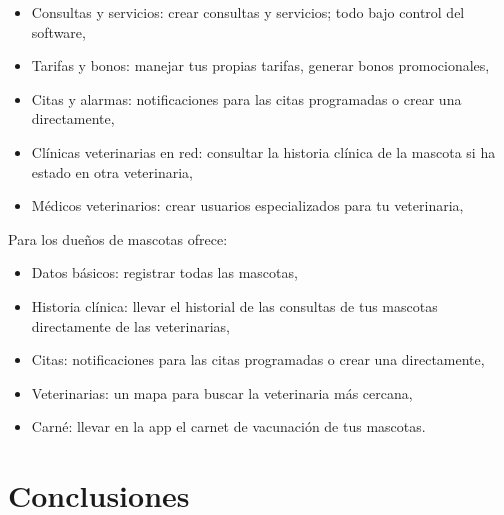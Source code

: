 %		

\begin{itemize}
	\item	Consultas y servicios: crear consultas y servicios; todo bajo control del software,
	\item	Tarifas y bonos: manejar tus propias tarifas, generar bonos promocionales,
	\item	Citas y alarmas: notificaciones para las citas programadas o crear una directamente,
	\item	Clínicas veterinarias en red: consultar la historia clínica de la mascota si ha estado en otra veterinaria,
	\item	Médicos veterinarios: crear usuarios especializados para tu veterinaria,
\end{itemize}
Para los dueños de mascotas ofrece:
\begin{itemize}
	\item	Datos básicos: registrar todas las mascotas,
	\item	Historia clínica: llevar el historial de las consultas de tus mascotas directamente de las veterinarias,
	\item	Citas: notificaciones para las citas programadas o crear una directamente,
	\item	Veterinarias: un mapa para buscar la veterinaria más cercana,
	\item	Carné: llevar en la app el carnet de vacunación de tus mascotas.
\end{itemize}



\section{Conclusiones}\label{chapter:conclus}

